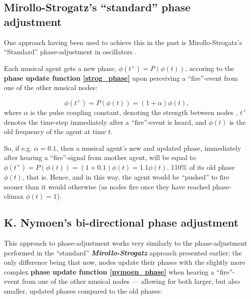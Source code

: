 

	\subsection{Mirollo-Strogatz's ``standard'' phase adjustment} %
	\label{mirollo_strogatz_phase_adjust}
	
	
	
	
	One approach having been used to achieve this in the past is Mirollo-Strogatz's ``Standard'' phase-adjustment in oscillators \cite{mirollo_strogatz_PCO_synch}.
	
	Each musical agent gets a new phase, $\phi(t^+) = P(\phi(t))$, accoring to the \textbf{phase update function \eqref{strog_phase}} upon perceiving a ``fire''-event from one of the other musical nodes:
	
	\begin{equation}
	\label{strog_phase}
		\phi(t^+) = P(\phi(t)) = (1 + \alpha)\phi(t) ,
	\end{equation} \nl
	where $\alpha$ is the pulse coupling constant, denoting the strength between nodes \cite{nymoen_synch}, $t^+$ denotes the time-step immediately after a ``fire''-event is heard, and $\phi(t)$ is the old frequency of the agent at time $t$. 
	
	So, if e.g. $\alpha = 0.1$, then a musical agent's new and updated phase, immediately after hearing a ``fire''-signal from another agent, will be equal to $\phi(t^+) = P(\phi(t)) = (1 + 0.1)\phi(t) = 1.1\phi(t)$. 110\% of its old phase $\phi(t)$, that is. Hence, and in this way, the agent would be ``pushed'' to fire sooner than it would otherwise (as nodes fire once they have reached phase-climax $\phi(t)=1$).


	\subsection{K. Nymoen's bi-directional phase adjustment} %
	\label{subsec:nymoen_phase_adjust}

	This approach to phase-adjustment works very similarly to the phase-adjustment performed in the ``standard'' \textbf{\textit{Mirollo-Strogatz}} approach presented earlier; the only difference being that now, nodes update their phases with the slightly more complex \textbf{phase update function \eqref{nymoen_phase}} when hearing a ``fire''-event from one of the other musical nodes — allowing for both larger, but also smaller, updated phases compared to the old phases:

